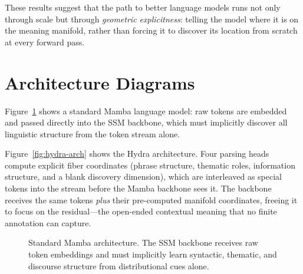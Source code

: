 \documentclass[11pt]{article}
\begin{document}
These results suggest that the path to better language models runs not 
only through scale but through \emph{geometric explicitness}: telling the 
model where it is on the meaning manifold, rather than forcing it to 
discover its location from scratch at every forward pass.




\appendix

\section{Architecture Diagrams}
\label{app:architecture}

Figure~\ref{fig:mamba-arch} shows a standard Mamba language model: 
raw tokens are embedded and passed directly into the SSM backbone, 
which must implicitly discover all linguistic structure from the 
token stream alone.

Figure~\ref{fig:hydra-arch} shows the Hydra architecture. Four 
parsing heads compute explicit fiber coordinates (phrase structure, 
thematic roles, information structure, and a blank discovery 
dimension), which are interleaved as special tokens into the stream 
before the Mamba backbone sees it. The backbone receives the same 
tokens \emph{plus} their pre-computed manifold coordinates, freeing 
it to focus on the residual---the open-ended contextual meaning that 
no finite annotation can capture.

\begin{figure}[h]
\centering
{}
\caption{Standard Mamba architecture. The SSM backbone receives raw 
token embeddings and must implicitly learn syntactic, thematic, and 
discourse structure from distributional cues alone.}
\label{fig:mamba-arch}
\end{figure}
\end{document}
